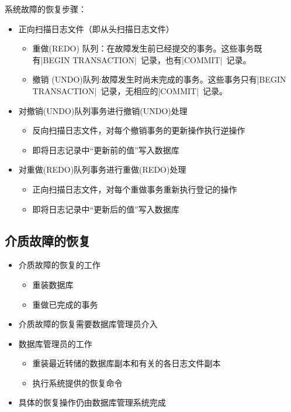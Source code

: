 系统故障的恢复步骤：
\begin{itemize}
    \item 正向扫描日志文件（即从头扫描日志文件）
    \begin{itemize}
        \item 重做(REDO) 队列：在故障发生前已经提交的事务。这些事务既有\sverb|BEGIN TRANSACTION|\ 记录，也有\sverb|COMMIT|\ 记录。
        \item 撤销 (UNDO)队列:故障发生时尚未完成的事务。这些事务只有\sverb|BEGIN TRANSACTION|\ 记录，无相应的\sverb|COMMIT|\ 记录。
    \end{itemize}
    \item 对撤销(UNDO)队列事务进行撤销(UNDO)处理
    \begin{itemize}
        \item 反向扫描日志文件，对每个撤销事务的更新操作执行逆操作
        \item 即将日志记录中“更新前的值”写入数据库 
    \end{itemize}
    \item 对重做(REDO)队列事务进行重做(REDO)处理
    \begin{itemize}
        \item 正向扫描日志文件，对每个重做事务重新执行登记的操作
        \item 即将日志记录中“更新后的值”写入数据库 
    \end{itemize}
\end{itemize}

\subsection{介质故障的恢复}
\begin{itemize}
    \item 介质故障的恢复的工作
    \vspace{-0.8em}
    \begin{multicols}{2}
        \begin{itemize}
            \item 重装数据库
            \item 重做已完成的事务
        \end{itemize}
    \end{multicols}
    \vspace{-1em}
    \item 介质故障的恢复需要数据库管理员介入
    \item 数据库管理员的工作
    \begin{itemize}
        \item 重装最近转储的数据库副本和有关的各日志文件副本
        \item 执行系统提供的恢复命令
    \end{itemize}
    \item 具体的恢复操作仍由数据库管理系统完成
\end{itemize}

